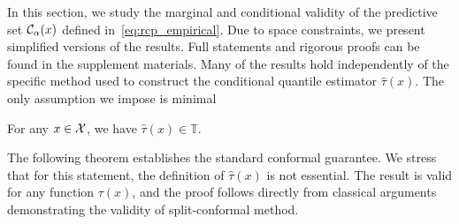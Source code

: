 
\vspace{-10pt}
  In this section, we study the marginal and conditional validity of the predictive set $\mathcal{C}_{\alpha}(x)$ defined in~\eqref{eq:rcp_empirical}. Due to space constraints, we present simplified versions of the results. Full statements and rigorous proofs can be found in the supplement materials. Many of the results hold independently of the specific method used to construct the conditional quantile estimator $\widehat{\tau}(x)$. The only assumption we impose is minimal
  \begin{assumption}\label{ass:tau-in-T} 
    For any $x\in\mathcal{X}$, we have $\widehat{\tau}(x)\in\mathbb{T}$.
  \end{assumption}
  The following theorem establishes the standard conformal guarantee. We stress that for this statement, the definition of \(\widehat{\tau}(x)\) is not essential. The result is valid for any function \(\tau(x)\), and the proof follows directly from classical arguments demonstrating the validity of split-conformal method.
  

